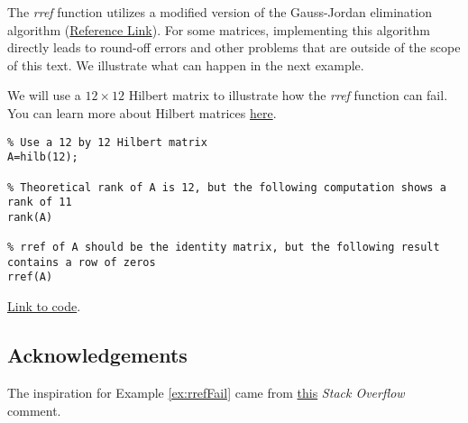 \documentclass{ximera}
\begin{document}
\begin{warning}
    The \emph{rref} function utilizes a modified version of the Gauss-Jordan elimination algorithm (\href{https://www.mathworks.com/help/matlab/ref/rref.html}{Reference Link}).  For some matrices, implementing this algorithm directly leads to round-off errors and other problems that are outside of the scope of this text.  %
    We illustrate what can happen in the next example.   
\end{warning}

\begin{example}\label{ex:rrefFail}
    We will use a $12\times 12$ Hilbert matrix to illustrate how the \emph{rref} function can fail.  You can learn more about Hilbert matrices \href{https://en.wikipedia.org/wiki/Hilbert_matrix}{here}.

\begin{verbatim}
% Use a 12 by 12 Hilbert matrix
A=hilb(12);

% Theoretical rank of A is 12, but the following computation shows a rank of 11
rank(A)

% rref of A should be the identity matrix, but the following result contains a row of zeros
rref(A)
\end{verbatim}

\href{https://sagecell.sagemath.org/?z=eJxtjjEOwjAMRfdKuYOXSkViSVfE0I0DwAGS1iUWaYwSR6WcnrSFjcWyrP_fcw23hGBAt2CXdV7IW4wCk5FIL1V1Z1cujW4PJ1WpqoarQ44o1BsP0YQH8AgdUCrlI9gsIA5hZO95pnCHnqdnFiPEAZLjORXZr6a1qta96Q47O0Ycd16JZj-AxQ1HAwYhWb5f_fNETNlL0QUxFDYLzyvrjZFT8RR08XwAMi9N1g==&lang=octave&interacts=eJyLjgUAARUAuQ==}{Link to code}.

\end{example}

\subsection*{Acknowledgements}

The inspiration for Example \ref{ex:rrefFail} came from \href{https://stackoverflow.com/questions/42893111/matlab-rref-function-precision-error-after-12th-column-of-hilbert-matrices}{this} \emph{Stack Overflow} comment.
\end{document}
